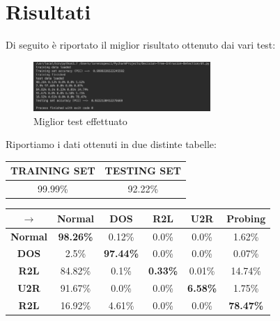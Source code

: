 \documentclass[a4paper,12pt]{article}
\begin{document}
\section{Risultati}
Di seguito è riportato il miglior risultato ottenuto dai vari test: 
\
\begin{figure}[h]
    \centering
    \captionsetup{justification=centering, margin=1cm}
    \includegraphics[width=0.6\textwidth]{./bestresult}
    \vspace*{5mm}
    \caption{Miglior test effettuato}
    \label{fig:dec}
\end{figure}
\newline

Riportiamo i dati ottenuti in due distinte tabelle:

\begin{center}
\vspace*{0.1cm}
\begin{tabular}{|c|c|}
\hline
\textbf{TRAINING SET}\bigstrut & \textbf{TESTING SET}\\\hline
99.99\% & 92.22\%\\\hline

\end{tabular}
\captionsetup{justification=centering}
\label{tab:tab1}
\end{center}


\begin{center}
\vspace*{0.5cm}
\begin{tabular}{|c|c|c|c|c|c|}
\hline
$\longrightarrow$ & \textbf{Normal}\bigstrut & \textbf{DOS} & \textbf{R2L} & \textbf{U2R} & \textbf{Probing} \\\hline
\textbf{Normal}\bigstrut & \textbf{98.26\%} & 0.12\% & 0.0\% & 0.0\% & 1.62\%\\\hline
\textbf{DOS}\bigstrut & 2.5\% & \textbf{97.44\%} & 0.0\% & 0.0\% & 0.07\%\\\hline
\textbf{R2L}\bigstrut & 84.82\% & 0.1\% & \textbf{0.33\%} & 0.01\% & 14.74\%\\\hline
\textbf{U2R}\bigstrut & 91.67\% & 0.0\% & 0.0\% & \textbf{6.58\%} & 1.75\%\\\hline
\textbf{R2L}\bigstrut & 16.92\% & 4.61\% & 0.0\% & 0.0\% & \textbf{78.47\%}\\\hline
\end{tabular}
\captionsetup{justification=centering}
\label{tab:tab1}
\end{center}
\end{document}
